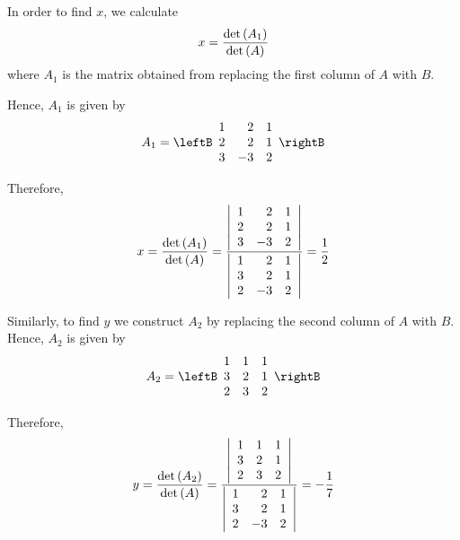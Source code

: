 {\begin{solution}
In order to find $x$, we calculate
\begin{equation*}
x =
\vspace{0.05in}\frac{\det \left(A_{1}\right)}{\det \left(A\right)}
\end{equation*}
where $A_1$ is the matrix obtained from replacing the first column of $A$ with $B$.

Hence, $A_1$ is given by 
\begin{equation*}
A_1 = 
\leftB
\begin{array}{rrr}
1 & 2 & 1 \\
2 & 2 & 1 \\
3 & -3 & 2
\end{array}
\rightB
\end{equation*}

Therefore,
\begin{equation*}
x=
\vspace{0.05in}\frac{\det \left(A_{1}\right)}{\det \left(A\right)}
=
\vspace{0.05in}\frac{\left|
\begin{array}{rrr}
1 &  2 & 1 \\
2 &  2 & 1 \\
3 & -3 & 2
\end{array}
\right| }{\left|
\begin{array}{rrr}
1 & 2 & 1 \\
3 & 2 & 1 \\
2 & -3 & 2
\end{array}
\right| }=\vspace{0.05in}\frac{1}{2}
\end{equation*}

Similarly, to find $y$ we construct $A_2$ by replacing the second column of $A$ with $B$. Hence, $A_2$ is given by
\begin{equation*}
A_2
=
\leftB
\begin{array}{rrr}
1 & 1 & 1 \\
3 & 2 & 1 \\
2 & 3 & 2
\end{array}
\rightB
\end{equation*}

Therefore, 
\begin{equation*}
y=\vspace{0.05in}\frac{\det \left(A_{2}\right)}{\det \left(A\right)} = \vspace{0.05in}\frac{\left|
\begin{array}{rrr}
1 & 1 & 1 \\
3 & 2 & 1 \\
2 & 3 & 2
\end{array}
\right| }{\left|
\begin{array}{rrr}
1 & 2 & 1 \\
3 & 2 & 1 \\
2 & -3 & 2
\end{array}
\right| }=-\vspace{0.05in}\frac{1}{7}
\end{equation*}


\end{solution}}
